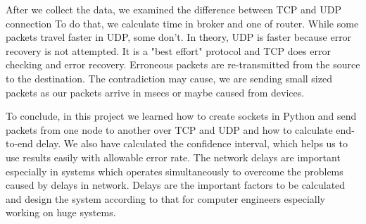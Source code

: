 After we collect the data, we examined the difference between TCP and UDP connection To do that, we calculate time in broker and one of router. While some packets travel faster in UDP, some don't. In theory, UDP is faster because error recovery is not attempted. It is a "best effort" protocol and TCP does error checking and error recovery. Erroneous packets are re-transmitted from the source to the destination. The contradiction may cause, we are sending small sized packets as our packets arrive in msecs or maybe caused from devices. 

To conclude, in this project we learned how to create sockets in Python and send packets from one node to another over TCP and UDP and how to calculate end-to-end delay. We also have calculated the confidence interval, which helps us to use results easily with allowable error rate.
The network delays are important especially in systems which operates simultaneously to overcome the problems caused by delays in network. Delays are the important factors to be calculated and design the system according to that for computer engineers especially working on huge systems. 